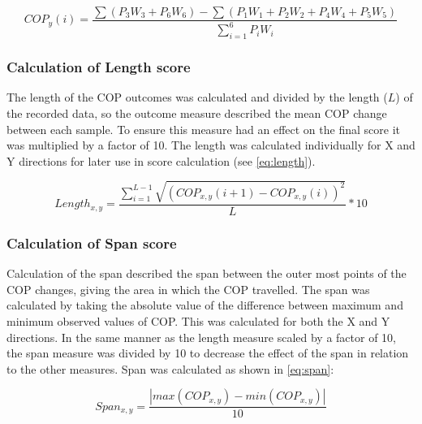 \begin{equation} \label{eq:COPy}
COP_y(i) =  \frac{\sum(P_3 W_3 + P_6 W_6) - \sum(P_1 W_1+P_2 W_2+P_4 W_4+P_5 W_5)}{\sum_{i=1}^{6}P_i W_i}
\end{equation} 



\subsubsection{Calculation of Length score}
The length of the COP outcomes was calculated and divided by the length ($L$) of the recorded data, so the outcome measure described the mean COP change between each sample. To ensure this measure had an effect on the final score it was multiplied by a factor of 10. The length was calculated individually for X and Y directions for later use in score calculation (see \eqref{eq:length}).

\begin{equation} \label{eq:length}
Length_{x,y} = \frac{\sum_{i=1}^{L-1}\sqrt{(COP_{x,y} (i+1)-COP_{x,y} (i))^2}}{L} * 10
\end{equation}


\subsubsection{Calculation of Span score}
Calculation of the span described the span between the outer most points of the COP changes, giving the area in which the COP travelled. 
The span was calculated by taking the absolute value of the difference between maximum and minimum observed values of COP. This was calculated for both the X and Y directions. In the same manner as the length measure scaled by a factor of 10, the span measure was divided by 10 to decrease the effect of the span in relation to the other measures. Span was calculated as shown in \eqref{eq:span}:

\begin{equation} \label{eq:span}
Span_{x,y} = \frac{\left| max(COP_{x,y})-min(COP_{x,y})\right|}{10}
\end{equation}


